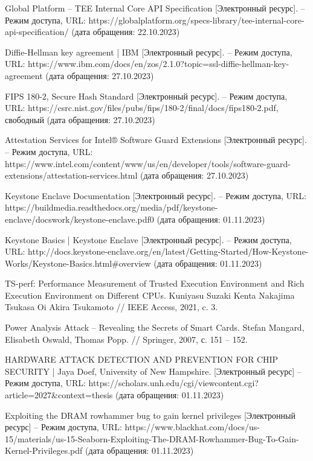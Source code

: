 \begin{thebibliography}{}
Global Platform -- TEE Internal Core API Specification [Электронный ресурс]. – Режим доступа, URL: https://globalplatform.org/specs-library/tee-internal-core-api-specification/ (дата обращения: 22.10.2023)

Diffie-Hellman key agreement | IBM [Электронный ресурс]. – Режим доступа, URL: https://www.ibm.com/docs/en/zos/2.1.0?topic=ssl-diffie-hellman-key-agreement (дата обращения: 27.10.2023)

FIPS 180-2, Secure Hash Standard [Электронный ресурс]. – Режим доступа, URL: https://csrc.nist.gov/files/pubs/fips/180-2/final/docs/fips180-2.pdf, свободный (дата обращения: 27.10.2023)

Attestation Services for Intel® Software Guard Extensions [Электронный ресурс]. – Режим доступа, URL: https://www.intel.com/content/www/us/en/developer/tools/software-guard-extensions/attestation-services.html (дата обращения: 27.10.2023)

Keystone Enclave Documentation [Электронный ресурс]. – Режим доступа, URL: https://buildmedia.readthedocs.org/media/pdf/keystone-enclave/docswork/keystone-enclave.pdf0 (дата обращения: 01.11.2023)

Keystone Basics | Keystone Enclave [Электронный ресурс]. – Режим доступа, URL: http://docs.keystone-enclave.org/en/latest/Getting-Started/How-Keystone-Works/Keystone-Basics.html\#overview (дата обращения: 01.11.2023)

TS-perf: Performance Measurement of Trusted Execution Environment and Rich Execution Environment on Different CPUs. Kuniyasu Suzaki Kenta Nakajima Tsukasa Oi Akira Tsukamoto // IEEE Access, 2021, c. 3.

Power Analysis Attack -- Revealing the Secrets of Smart Cards. Stefan Mangard, Elisabeth Oswald, Thomas Popp. // Springer, 2007, с. 151 – 152.

HARDWARE ATTACK DETECTION AND PREVENTION FOR CHIP SECURITY | Jaya Doef, University of New Hampshire. [Электронный ресурс] – Режим доступа, URL: https://scholars.unh.edu/cgi/viewcontent.cgi?article=2027\&context=thesis (дата обращения: 01.11.2023)

Exploiting the DRAM rowhammer bug to gain kernel privileges [Электронный ресурс] – Режим доступа, URL: https://www.blackhat.com/docs/us-15/materials/us-15-Seaborn-Exploiting-The-DRAM-Rowhammer-Bug-To-Gain-Kernel-Privileges.pdf (дата обращения: 01.11.2023)


\end{thebibliography}
